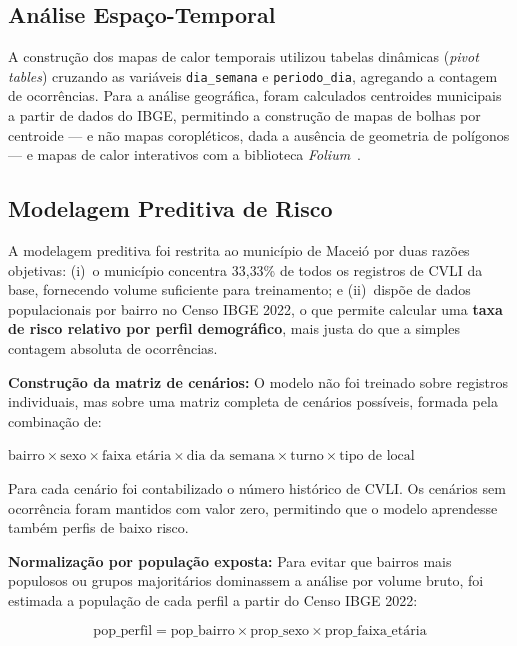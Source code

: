 \documentclass[12pt]{article}
\begin{document}
\subsection{Análise Espaço-Temporal}
A construção dos mapas de calor temporais utilizou tabelas dinâmicas
(\textit{pivot tables}) cruzando as variáveis \texttt{dia\_semana} e
\texttt{periodo\_dia}, agregando a contagem de ocorrências. Para a análise
geográfica, foram calculados centroides municipais a partir de dados do IBGE,
permitindo a construção de mapas de bolhas por centroide --- e não mapas
coropléticos, dada a ausência de geometria de polígonos --- e mapas de calor
interativos com a biblioteca \textit{Folium}~\cite{folium:2023}.

\subsection{Modelagem Preditiva de Risco}
A modelagem preditiva foi restrita ao município de Maceió por duas razões
objetivas: (i)~o município concentra 33,33\% de todos os registros de CVLI da
base, fornecendo volume suficiente para treinamento; e (ii)~dispõe de dados
populacionais por bairro no Censo IBGE 2022, o que permite calcular uma
\textbf{taxa de risco relativo por perfil demográfico}, mais justa do que a
simples contagem absoluta de ocorrências.

\textbf{Construção da matriz de cenários:} O modelo não foi treinado sobre
registros individuais, mas sobre uma matriz completa de cenários possíveis,
formada pela combinação de:

\begin{center}
$\text{bairro} \times \text{sexo} \times \text{faixa etária} \times
\text{dia da semana} \times \text{turno} \times \text{tipo de local}$
\end{center}

Para cada cenário foi contabilizado o número histórico de CVLI. Os cenários
sem ocorrência foram mantidos com valor zero, permitindo que o modelo
aprendesse também perfis de baixo risco.

\textbf{Normalização por população exposta:} Para evitar que bairros mais
populosos ou grupos majoritários dominassem a análise por volume bruto, foi
estimada a população de cada perfil a partir do Censo IBGE 2022:

\begin{equation}
\text{pop\_perfil} = \text{pop\_bairro}
  \times \text{prop\_sexo}
  \times \text{prop\_faixa\_etária}
\end{equation}
\end{document}
